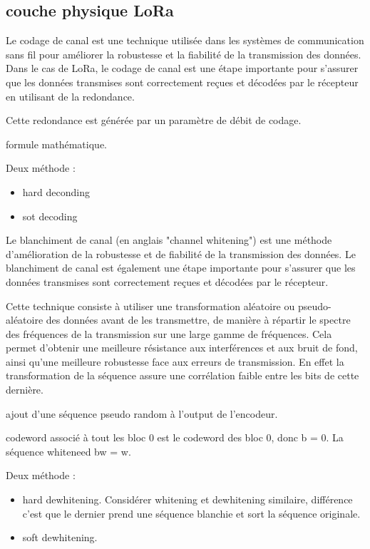 \documentclass[12pt,a4paper,oneside, titlepage]{report}
\begin{document}
\subsection{couche physique LoRa}

Le codage de canal est une technique utilisée dans les systèmes de communication sans fil pour améliorer la robustesse et la fiabilité de la transmission des données. Dans le cas de LoRa, le codage de canal est une étape importante pour s'assurer que les données transmises sont correctement reçues et décodées par le récepteur en utilisant de la redondance.

Cette redondance est générée par un paramètre de débit de codage.


formule mathématique.


Deux méthode :

\begin{itemize}
\item hard deconding
\item sot decoding
\end{itemize}



Le blanchiment de canal (en anglais "channel whitening") est une méthode d'amélioration de la robustesse et de fiabilité de la transmission des données. Le blanchiment de canal est également une étape importante pour s'assurer que les données transmises sont correctement reçues et décodées par le récepteur.

Cette technique consiste à utiliser une transformation aléatoire ou pseudo-aléatoire des données avant de les transmettre, de manière à répartir le spectre des fréquences de la transmission sur une large gamme de fréquences. Cela permet d'obtenir une meilleure résistance aux interférences et aux bruit de fond, ainsi qu'une meilleure robustesse face aux erreurs de transmission. En effet la transformation de la séquence assure une corrélation faible entre les bits de cette dernière.



ajout d'une séquence pseudo random à l'output de l'encodeur.


codeword associé à tout les bloc 0 est le codeword des bloc 0, donc b = 0. La séquence whiteneed bw = w.

Deux méthode :

\begin{itemize}
\item hard dewhitening. Considérer whitening et dewhitening similaire, différence c'est que le dernier prend une séquence blanchie et sort la séquence originale.
\item soft dewhitening. 
\end{itemize}
\end{document}
